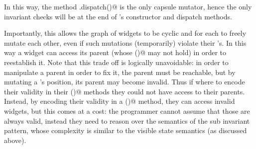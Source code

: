 In this way, the method \Q@WidgetWithInvariant.dispatch()@ is the only capsule mutator, hence the only invariant checks will be at the end of \Q@WidgetWithInvariant@'s constructor and dispatch methods.

Importantly, this allows the graph of widgets to be cyclic and for each to freely mutate each
other, even if such mutations (temporarily) violate their \Q@subInvariant@'s.
In this way a widget can access its parent (whose \Q@subInvariant()@ may not hold) in order to reestablish it.
Note that this trade off is logically unavoidable:
in order to manipulate a parent in order to fix it, the parent must be reachable, but
by mutating a \Q@Widget@'s position, its parent may become invalid.
Thus if \Q@Widget@s where to encode their validity in their \Q@invariant()@ methods they could not have access to their parents.
Instead, by encoding their validity in a \Q@subInvariant()@ method,
they can access invalid widgets, but this comes at a cost: the programmer 
cannot assume that those \Q@Widgets@ are always valid, instead they
need to reason over the semantics of the sub invariant pattern, whose complexity is similar to the visible state semantics (as discussed above). 

